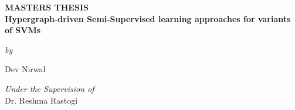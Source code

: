 \documentclass[12pt,a4paper,oneside,english]{report}
\begin{document}
\newpage
\thispagestyle{empty}
\begin{center}
	\vspace*{-2cm}  
	{\Large \bf MASTERS THESIS\\}
	\vspace*{0.8cm}
	{\Large \textbf{Hypergraph-driven  Semi-Supervised  learning approaches for variants of SVMs}\\}

	\vspace*{0.6cm}
	\textit{by}

	\vspace{0.4cm}

	{ \large Dev Nirwal } 
	
	\vspace*{0.9cm}
	{ \it Under the Supervision of}\\{\large Dr. Reshma Rastogi}
	\\
	
	\vspace*{0.9cm}
	

\end{center}
\end{document}
